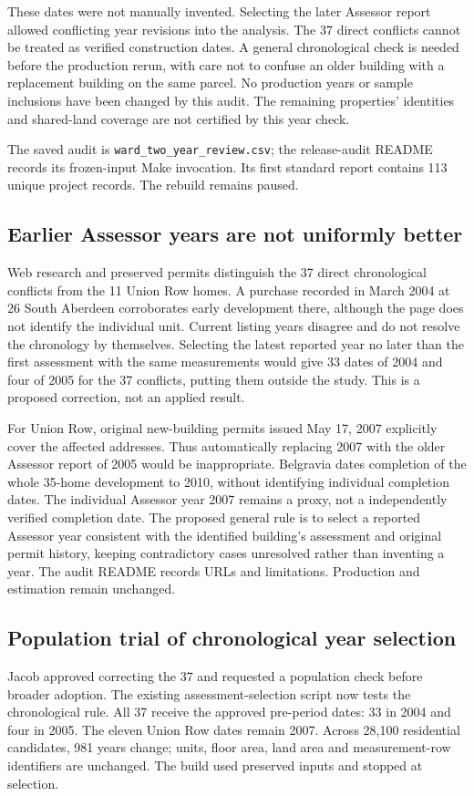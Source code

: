 These dates were not manually invented. Selecting the later Assessor report
allowed conflicting year revisions into the analysis. The 37 direct conflicts
cannot be treated as verified construction dates. A general chronological check
is needed before the production rerun, with care not to confuse an older building
with a replacement building on the same parcel. No production years or sample
inclusions have been changed by this audit. The remaining properties' identities
and shared-land coverage are not certified by this year check.

The saved audit is \texttt{ward\_two\_year\_review.csv}; the release-audit README
records its frozen-input Make invocation. Its first standard report contains
113 unique project records. The rebuild remains paused.

\subsection*{Earlier Assessor years are not uniformly better}
Web research and preserved permits distinguish the 37 direct chronological
conflicts from the 11 Union Row homes. A purchase recorded in March 2004 at
26 South Aberdeen corroborates early development there, although the page does
not identify the individual unit. Current listing years disagree and do not
resolve the chronology by themselves. Selecting the latest reported year no
later than the first assessment with the same measurements would give 33 dates
of 2004 and four of 2005 for the 37 conflicts, putting them outside the study.
This is a proposed correction, not an applied result.

For Union Row, original new-building permits issued May 17, 2007 explicitly
cover the affected addresses. Thus automatically replacing 2007 with the older
Assessor report of 2005 would be inappropriate. Belgravia dates completion of the
whole 35-home development to 2010, without identifying individual completion
dates. The individual Assessor year 2007 remains a proxy, not a independently
verified completion date. The proposed general rule is to select a reported
Assessor year consistent with the identified building's assessment and original
permit history, keeping contradictory cases unresolved rather than inventing a
year. The audit README records URLs and limitations. Production and estimation
remain unchanged.

\subsection*{Population trial of chronological year selection}
Jacob approved correcting the 37 and requested a population check before broader
adoption. The existing assessment-selection script now tests the chronological
rule. All 37 receive the approved pre-period dates: 33 in 2004 and four in 2005.
The eleven Union Row dates remain 2007. Across 28,100 residential candidates,
981 years change; units, floor area, land area and measurement-row identifiers
are unchanged. The build used preserved inputs and stopped at selection.

